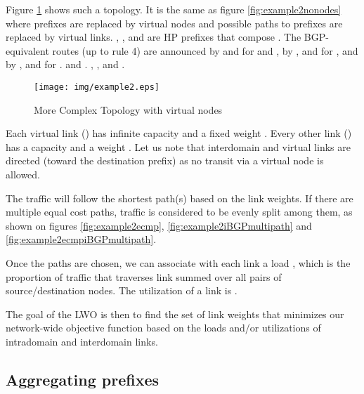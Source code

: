 \documentclass{acm_proc_article-sp}
\begin{document}
Figure \ref{fig:example2} shows such a topology. It is the same as
figure \ref{fig:example2nonodes} where prefixes are replaced by
virtual nodes and possible paths to prefixes are replaced by virtual links.
, ,  and  are HP prefixes that compose . 
The BGP-equivalent routes (up to rule 4) are announced by  and  for  and , by ,
 and  for , and by ,  and  for .
 and . , , and .

\begin{figure}[htbp]
  \centering
  \texttt{[image: img/example2.eps]}
  \caption{More Complex Topology with virtual nodes}
  \label{fig:example2}
\end{figure}

Each virtual link () has infinite
capacity  and a fixed weight . 
Every other link () has a capacity  and a
weight . 
Let us note that interdomain and virtual links are directed (toward
the destination prefix) as no transit via a virtual node is
allowed.

The traffic will follow the shortest path(s) 
based on the link weights. If there are multiple equal cost paths,
traffic is considered to be evenly split among them, as shown on figures
\ref{fig:example2ecmp}, \ref{fig:example2iBGPmultipath} and
\ref{fig:example2ecmpiBGPmultipath}.

Once the paths are chosen, we can associate with each link  a load
, which is the proportion of traffic that traverses link  
summed over all pairs of source/destination nodes.
The utilization of a link  is .

The goal of the LWO is then to find the set of link weights 
that minimizes our network-wide objective function based on the
loads and/or utilizations of intradomain and interdomain links.

\subsection{Aggregating prefixes}
\end{document}
